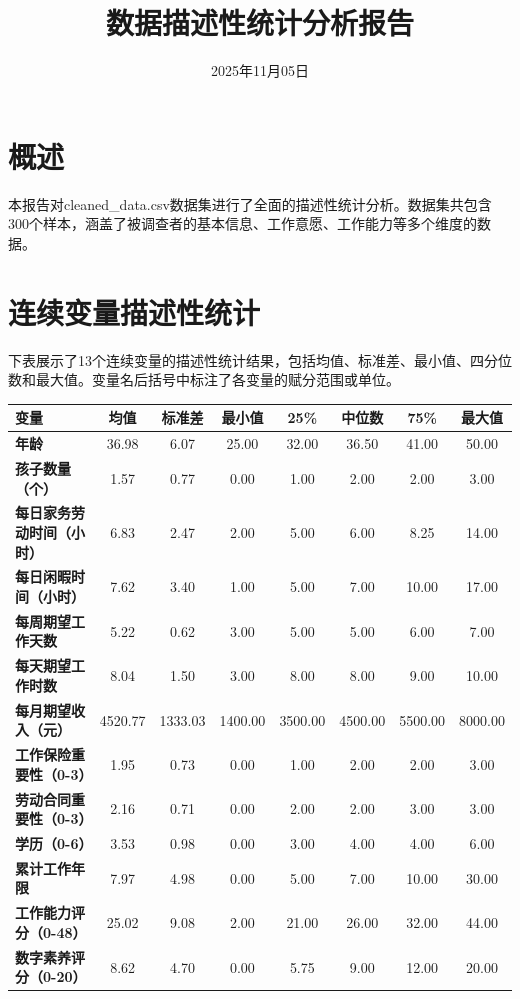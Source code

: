 \documentclass[12pt,a4paper]{article}
\title{\textbf{数据描述性统计分析报告}}
\author{}
\date{2025年11月05日}
\begin{document}
\maketitle

\section{概述}

本报告对cleaned\_data.csv数据集进行了全面的描述性统计分析。数据集共包含300个样本，涵盖了被调查者的基本信息、工作意愿、工作能力等多个维度的数据。

\section{连续变量描述性统计}

下表展示了13个连续变量的描述性统计结果，包括均值、标准差、最小值、四分位数和最大值。变量名后括号中标注了各变量的赋分范围或单位。

\begin{table}[htbp]
\centering
\begin{tabular}{lccccccc}
\toprule
\textbf{变量} & \textbf{均值} & \textbf{标准差} & \textbf{最小值} & \textbf{25\%} & \textbf{中位数} & \textbf{75\%} & \textbf{最大值} \\
\midrule
\textbf{年龄} & 36.98 & 6.07 & 25.00 & 32.00 & 36.50 & 41.00 & 50.00 \\
\textbf{孩子数量（个）} & 1.57 & 0.77 & 0.00 & 1.00 & 2.00 & 2.00 & 3.00 \\
\textbf{每日家务劳动时间（小时）} & 6.83 & 2.47 & 2.00 & 5.00 & 6.00 & 8.25 & 14.00 \\
\textbf{每日闲暇时间（小时）} & 7.62 & 3.40 & 1.00 & 5.00 & 7.00 & 10.00 & 17.00 \\
\textbf{每周期望工作天数} & 5.22 & 0.62 & 3.00 & 5.00 & 5.00 & 6.00 & 7.00 \\
\textbf{每天期望工作时数} & 8.04 & 1.50 & 3.00 & 8.00 & 8.00 & 9.00 & 10.00 \\
\textbf{每月期望收入（元）} & 4520.77 & 1333.03 & 1400.00 & 3500.00 & 4500.00 & 5500.00 & 8000.00 \\
\textbf{工作保险重要性（0-3）} & 1.95 & 0.73 & 0.00 & 1.00 & 2.00 & 2.00 & 3.00 \\
\textbf{劳动合同重要性（0-3）} & 2.16 & 0.71 & 0.00 & 2.00 & 2.00 & 3.00 & 3.00 \\
\textbf{学历（0-6）} & 3.53 & 0.98 & 0.00 & 3.00 & 4.00 & 4.00 & 6.00 \\
\textbf{累计工作年限} & 7.97 & 4.98 & 0.00 & 5.00 & 7.00 & 10.00 & 30.00 \\
\textbf{工作能力评分（0-48）} & 25.02 & 9.08 & 2.00 & 21.00 & 26.00 & 32.00 & 44.00 \\
\textbf{数字素养评分（0-20）} & 8.62 & 4.70 & 0.00 & 5.75 & 9.00 & 12.00 & 20.00 \\
\bottomrule
\end{tabular}
\end{table}
\end{document}
